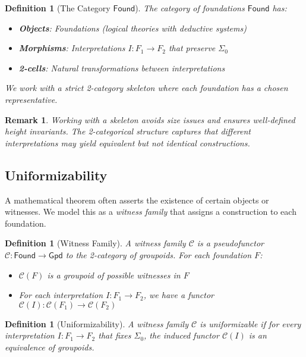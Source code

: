 \documentclass[11pt]{article}
\newtheorem{definition}[theorem]{Definition}
\newtheorem{remark}[theorem]{Remark}
\newcommand{\Found}{\mathsf{Found}}
\newcommand{\Gpd}{\mathsf{Gpd}}
\newcommand{\SigmaZero}{\Sigma_{0}}
\begin{document}
\begin{definition}[The Category \(\Found\)]
The \emph{category of foundations} $\Found$ has:
\begin{itemize}
\item \textbf{Objects}: Foundations (logical theories with deductive systems)
\item \textbf{Morphisms}: Interpretations $I: F_1 \to F_2$ that preserve $\SigmaZero$
\item \textbf{2-cells}: Natural transformations between interpretations
\end{itemize}
We work with a strict 2-category skeleton where each foundation has a chosen representative.
\end{definition}

\begin{remark}
Working with a skeleton avoids size issues and ensures well-defined height invariants. The 2-categorical structure captures that different interpretations may yield equivalent but not identical constructions.
\end{remark}

\subsection{Uniformizability}

A mathematical theorem often asserts the existence of certain objects or witnesses. We model this as a \emph{witness family} that assigns a construction to each foundation.

\begin{definition}[Witness Family]
A \emph{witness family} $\mathcal{C}$ is a pseudofunctor $\mathcal{C}: \Found \to \Gpd$ to the 2-category of groupoids. For each foundation $F$:
\begin{itemize}
\item $\mathcal{C}(F)$ is a groupoid of possible witnesses in $F$
\item For each interpretation $I: F_1 \to F_2$, we have a functor $\mathcal{C}(I): \mathcal{C}(F_1) \to \mathcal{C}(F_2)$
\end{itemize}
\end{definition}

\begin{definition}[Uniformizability]\label{def:uniformizable}
A witness family $\mathcal{C}$ is \emph{uniformizable} if for every interpretation $I: F_1 \to F_2$ that fixes $\SigmaZero$, the induced functor $\mathcal{C}(I)$ is an equivalence of groupoids.
\end{definition}
\end{document}
